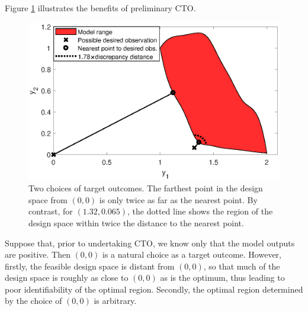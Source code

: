 \documentclass[12pt]{article}
\begin{document}
Figure \ref{fig:do_selection_example} illustrates the benefits of preliminary CTO.
%
\begin{figure}
\centering
\includegraphics[scale=.8]{FIG_des_obs_selection_example.eps}
\caption{Two choices of target outcomes. 
%
The farthest point in the design space from $(0,0)$ is only twice as far as  the nearest point.
%
By contrast, for $(1.32,0.065)$, the dotted line shows the region of the design space within twice the distance to the nearest point.}
\label{fig:do_selection_example}
\end{figure}
%
Suppose that, prior to undertaking CTO, we know only that the model outputs are positive.
%
Then $(0,0)$ is a natural choice as a target outcome.
%
%
However, firstly, the feasible design space is distant from $(0,0)$, so that much of the design space is roughly as close to $(0,0)$ as is the optimum, thus leading to poor identifiability of the optimal region.
%
%
%
%
Secondly, the optimal region determined by the choice of $(0,0)$ is arbitrary.
%
\end{document}
